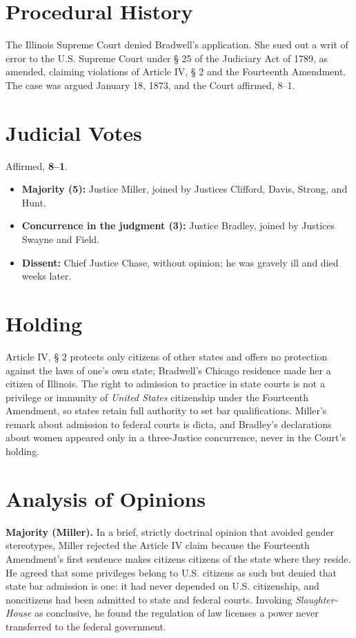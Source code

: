 \documentclass[12pt]{article}
\begin{document}
\section{Procedural History}

The Illinois Supreme Court denied Bradwell's application. She sued out a writ of error to the U.S. Supreme Court under \S{} 25 of the Judiciary Act of 1789, as amended, claiming violations of Article IV, \S{} 2 and the Fourteenth Amendment. The case was argued January 18, 1873, and the Court affirmed, 8--1.

\section{Judicial Votes}

Affirmed, \textbf{8--1}.
\begin{itemize}
\item \textbf{Majority (5):} Justice Miller, joined by Justices Clifford, Davis, Strong, and Hunt.
\item \textbf{Concurrence in the judgment (3):} Justice Bradley, joined by Justices Swayne and Field.
\item \textbf{Dissent:} Chief Justice Chase, without opinion; he was gravely ill and died weeks later.
\end{itemize}

\section{Holding}

Article IV, \S{} 2 protects only citizens of other states and offers no protection against the laws of one's own state; Bradwell's Chicago residence made her a citizen of Illinois. The right to admission to practice in state courts is not a privilege or immunity of \textit{United States} citizenship under the Fourteenth Amendment, so states retain full authority to set bar qualifications. Miller's remark about admission to federal courts is dicta, and Bradley's declarations about women appeared only in a three-Justice concurrence, never in the Court's holding.

\section{Analysis of Opinions}

\textbf{Majority (Miller).} In a brief, strictly doctrinal opinion that avoided gender stereotypes, Miller rejected the Article IV claim because the Fourteenth Amendment's first sentence makes citizens citizens of the state where they reside. He agreed that some privileges belong to U.S. citizens as such but denied that state bar admission is one: it had never depended on U.S. citizenship, and noncitizens had been admitted to state and federal courts. Invoking \textit{Slaughter-House} as conclusive, he found the regulation of law licenses a power never transferred to the federal government.
\end{document}
